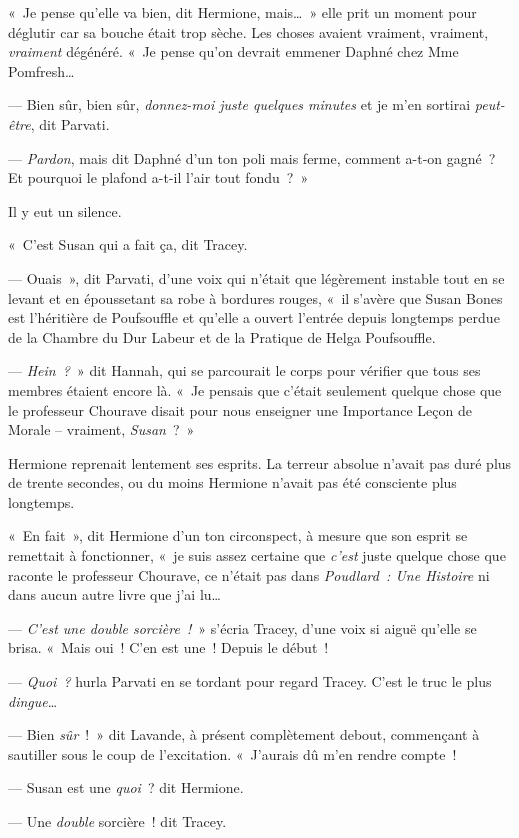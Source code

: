 «~Je pense qu'elle va bien, dit Hermione, mais…~» elle prit un moment pour déglutir car sa bouche était trop sèche. Les choses avaient vraiment, vraiment, \emph{vraiment} dégénéré. «~Je pense qu'on devrait emmener Daphné chez Mme Pomfresh…

--- Bien sûr, bien sûr, \emph{donnez-moi juste quelques minutes} et je m'en sortirai \emph{peut-être}, dit Parvati.

--- \emph{Pardon}, mais dit Daphné d'un ton poli mais ferme, comment a-t-on gagné~? Et pourquoi le plafond a-t-il l'air tout fondu~?~»

Il y eut un silence.

«~C'est Susan qui a fait ça, dit Tracey.

--- Ouais~», dit Parvati, d'une voix qui n'était que légèrement instable tout en se levant et en époussetant sa robe à bordures rouges, «~il s'avère que Susan Bones est l'héritière de Poufsouffle et qu'elle a ouvert l'entrée depuis longtemps perdue de la Chambre du Dur Labeur et de la Pratique de Helga Poufsouffle.

--- \emph{Hein~?}~» dit Hannah, qui se parcourait le corps pour vérifier que tous ses membres étaient encore là. «~Je pensais que c'était seulement quelque chose que le professeur Chourave disait pour nous enseigner une Importance Leçon de Morale -- vraiment, \emph{Susan}~?~»

Hermione reprenait lentement ses esprits. La terreur absolue n'avait pas duré plus de trente secondes, ou du moins Hermione n'avait pas été consciente plus longtemps.

«~En fait~», dit Hermione d'un ton circonspect, à mesure que son esprit se remettait à fonctionner, «~je suis assez certaine que \emph{c'est} juste quelque chose que raconte le professeur Chourave, ce n'était pas dans \emph{Poudlard~: Une Histoire} ni dans aucun autre livre que j'ai lu…

--- \emph{C'est une double sorcière~!}~» s'écria Tracey, d'une voix si aiguë qu'elle se brisa. «~Mais oui~! C'en est une~! Depuis le début~!

--- \emph{Quoi~?} hurla Parvati en se tordant pour regard Tracey. C'est le truc le plus \emph{dingue}…

--- Bien \emph{sûr}~!~» dit Lavande, à présent complètement debout, commençant à sautiller sous le coup de l'excitation. «~J'aurais dû m'en rendre compte~!

--- Susan est une \emph{quoi}~? dit Hermione.

--- Une \emph{double} sorcière~! dit Tracey.

